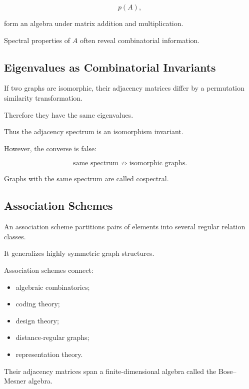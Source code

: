 \[
p(A),
\]

form an algebra under matrix addition and multiplication.

Spectral properties of \(A\) often reveal combinatorial information.

\subsection{Eigenvalues as Combinatorial Invariants}
\label{subsec:eigenvalues-combinatorial-invariants}

If two graphs are isomorphic, their adjacency matrices differ by a
permutation similarity transformation.

Therefore they have the same eigenvalues.

Thus the adjacency spectrum is an isomorphism invariant.

However, the converse is false:

\[
\boxed{
\text{same spectrum}
\not\Longrightarrow
\text{isomorphic graphs}.
}
\]

Graphs with the same spectrum are called cospectral.

\subsection{Association Schemes}
\label{subsec:association-schemes}

An association scheme partitions pairs of elements into several regular
relation classes.

It generalizes highly symmetric graph structures.

Association schemes connect:

\begin{itemize}
    \item algebraic combinatorics;
    \item coding theory;
    \item design theory;
    \item distance-regular graphs;
    \item representation theory.
\end{itemize}

Their adjacency matrices span a finite-dimensional algebra called the
Bose--Mesner algebra.

